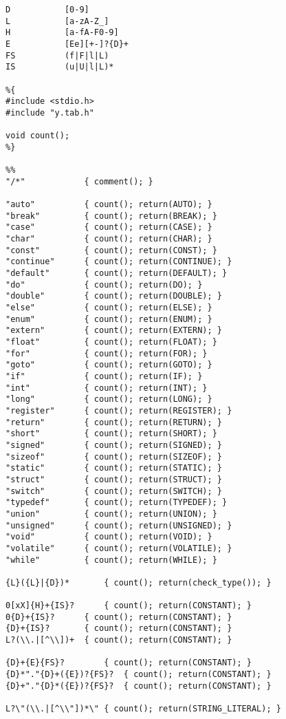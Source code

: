 \documentclass[a4paper,11pt]{article}
\theoremstyle{mytheor}
\begin{document}
\begin{lstlisting}[label={list:first},caption=Sample LEX Code -- Fibonacci sequence calculated analytically.]
D			[0-9]
L			[a-zA-Z_]
H			[a-fA-F0-9]
E			[Ee][+-]?{D}+
FS			(f|F|l|L)
IS			(u|U|l|L)*

%{
#include <stdio.h>
#include "y.tab.h"

void count();
%}

%%
"/*"			{ comment(); }

"auto"			{ count(); return(AUTO); }
"break"			{ count(); return(BREAK); }
"case"			{ count(); return(CASE); }
"char"			{ count(); return(CHAR); }
"const"			{ count(); return(CONST); }
"continue"		{ count(); return(CONTINUE); }
"default"		{ count(); return(DEFAULT); }
"do"			{ count(); return(DO); }
"double"		{ count(); return(DOUBLE); }
"else"			{ count(); return(ELSE); }
"enum"			{ count(); return(ENUM); }
"extern"		{ count(); return(EXTERN); }
"float"			{ count(); return(FLOAT); }
"for"			{ count(); return(FOR); }
"goto"			{ count(); return(GOTO); }
"if"			{ count(); return(IF); }
"int"			{ count(); return(INT); }
"long"			{ count(); return(LONG); }
"register"		{ count(); return(REGISTER); }
"return"		{ count(); return(RETURN); }
"short"			{ count(); return(SHORT); }
"signed"		{ count(); return(SIGNED); }
"sizeof"		{ count(); return(SIZEOF); }
"static"		{ count(); return(STATIC); }
"struct"		{ count(); return(STRUCT); }
"switch"		{ count(); return(SWITCH); }
"typedef"		{ count(); return(TYPEDEF); }
"union"			{ count(); return(UNION); }
"unsigned"		{ count(); return(UNSIGNED); }
"void"			{ count(); return(VOID); }
"volatile"		{ count(); return(VOLATILE); }
"while"			{ count(); return(WHILE); }

{L}({L}|{D})*		{ count(); return(check_type()); }

0[xX]{H}+{IS}?		{ count(); return(CONSTANT); }
0{D}+{IS}?		{ count(); return(CONSTANT); }
{D}+{IS}?		{ count(); return(CONSTANT); }
L?(\\.|[^\\])+	{ count(); return(CONSTANT); }

{D}+{E}{FS}?		{ count(); return(CONSTANT); }
{D}*"."{D}+({E})?{FS}?	{ count(); return(CONSTANT); }
{D}+"."{D}*({E})?{FS}?	{ count(); return(CONSTANT); }

L?\"(\\.|[^\\"])*\"	{ count(); return(STRING_LITERAL); }


\end{lstlisting}
\end{document}

